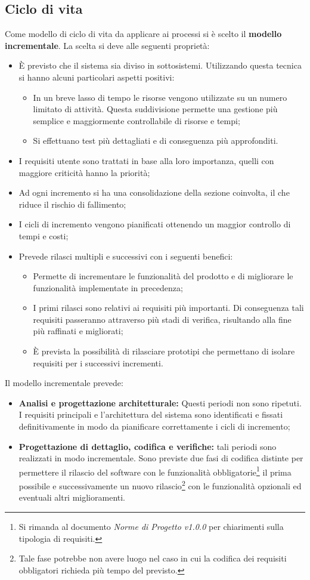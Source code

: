 \subsection{Ciclo di vita}
Come modello di ciclo di vita da applicare ai processi si è scelto il \textbf{modello incrementale}. La scelta si deve alle seguenti proprietà:
\begin{itemize}
	\item È previsto che il sistema sia diviso in sottosistemi. Utilizzando questa tecnica si hanno alcuni particolari aspetti positivi:
	\begin{itemize}
		\item In un breve lasso di tempo le risorse vengono utilizzate su un numero limitato di attività. Questa suddivisione permette una gestione più semplice e maggiormente controllabile di risorse e tempi;
		\item Si effettuano test più dettagliati e di conseguenza più approfonditi.
	\end{itemize}
	\item I requisiti utente sono trattati in base alla loro importanza, quelli con maggiore criticità hanno la priorità;
	\item Ad ogni incremento si ha una consolidazione della sezione coinvolta, il che riduce il rischio di fallimento;
	\item I cicli di incremento vengono pianificati ottenendo un maggior controllo di tempi e costi;
	\item Prevede rilasci multipli e successivi con i seguenti benefici:
	\begin{itemize}
		\item Permette di incrementare le funzionalità del prodotto e di migliorare le funzionalità implementate in precedenza;
		\item I primi rilasci sono relativi ai requisiti più importanti. Di conseguenza tali requisiti passeranno attraverso più stadi di verifica, risultando alla fine più raffinati e migliorati;
		\item È prevista la possibilità di rilasciare prototipi che permettano di isolare requisiti per i successivi incrementi.
	\end{itemize}
\end{itemize}
Il modello incrementale prevede:
\begin{itemize}
	\item \textbf{Analisi e progettazione architetturale:} Questi periodi non sono ripetuti. I requisiti principali e l'architettura del sistema sono identificati e fissati definitivamente in modo da pianificare correttamente i cicli di incremento; 
	\item \textbf{Progettazione di dettaglio, codifica e verifiche:} tali periodi sono realizzati in modo incrementale. Sono previste due fasi di codifica distinte per permettere il rilascio del software con le funzionalità obbligatorie\footnote{Si rimanda al documento \textit{Norme di Progetto v1.0.0} per chiarimenti sulla tipologia di requisiti.} il prima possibile e successivamente un nuovo rilascio\footnote{Tale fase potrebbe non avere luogo nel caso in cui la codifica dei requisiti obbligatori richieda più tempo del previsto.} con le funzionalità opzionali ed eventuali altri miglioramenti.
\end{itemize}
